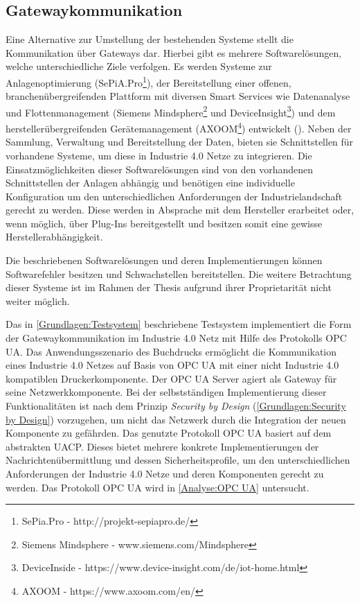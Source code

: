 \subsection{Gatewaykommunikation}
\label{Analyse:Gatewaykommunikation}
Eine Alternative zur Umstellung der bestehenden Systeme stellt die Kommunikation über Gateways dar. Hierbei gibt es mehrere Softwarelösungen, welche unterschiedliche Ziele verfolgen. Es werden Systeme zur Anlagenoptimierung (SePiA.Pro\footnote{SePia.Pro - http://projekt-sepiapro.de/}), der Bereitstellung einer offenen, branchenübergreifenden Plattform mit diversen Smart Services wie Datenanalyse und Flottenmanagement (Siemens Mindsphere\footnote{Siemens Mindsphere - www.siemens.com/Mindsphere} und DeviceInsight\footnote{DeviceInside - https://www.device-insight.com/de/iot-home.html}) und dem herstellerübergreifenden Gerätemanagement (AXOOM\footnote{AXOOM - https://www.axoom.com/en/}) entwickelt (\cite{acatec2016}). Neben der Sammlung, Verwaltung und Bereitstellung der Daten, bieten sie Schnittstellen für vorhandene Systeme, um diese in Industrie 4.0 Netze zu integrieren. Die Einsatzmöglichkeiten dieser Softwarelösungen sind von den vorhandenen Schnittstellen der Anlagen abhängig und benötigen eine individuelle Konfiguration um den unterschiedlichen Anforderungen der Industrielandschaft gerecht zu werden. Diese werden in Absprache mit dem Hersteller erarbeitet oder, wenn möglich, über Plug-Ins bereitgestellt und besitzen somit eine gewisse Herstellerabhängigkeit.

Die beschriebenen Softwarelösungen und deren Implementierungen können Softwarefehler besitzen und Schwachstellen bereitstellen. Die weitere Betrachtung dieser Systeme ist im Rahmen der Thesis aufgrund ihrer Proprietarität nicht weiter möglich.

Das in \autoref{Grundlagen:Testsystem} beschriebene Testsystem implementiert die Form der Gatewaykommunikation im Industrie 4.0 Netz mit Hilfe des Protokolls \ac{OPC UA}. Das Anwendungsszenario des Buchdrucks ermöglicht die Kommunikation eines Industrie 4.0 Netzes auf Basis von \ac{OPC UA} mit einer nicht Industrie 4.0 kompatiblen Druckerkomponente. Der \ac{OPC UA} Server agiert als Gateway für seine Netzwerkkomponente. Bei der selbstständigen Implementierung dieser Funktionalitäten ist nach dem Prinzip \textit{Security by Design} (\autoref{Grundlagen:Security by Design}) vorzugehen, um nicht das Netzwerk durch die Integration der neuen Komponente zu gefährden. Das genutzte Protokoll \ac{OPC UA} basiert auf dem abstrakten \ac{UACP}. Dieses bietet mehrere konkrete Implementierungen der Nachrichtenübermittlung und dessen Sicherheitsprofile, um den unterschiedlichen Anforderungen der Industrie 4.0 Netze und deren Komponenten gerecht zu werden. Das Protokoll \ac{OPC UA} wird in \autoref{Analyse:OPC UA} untersucht.

